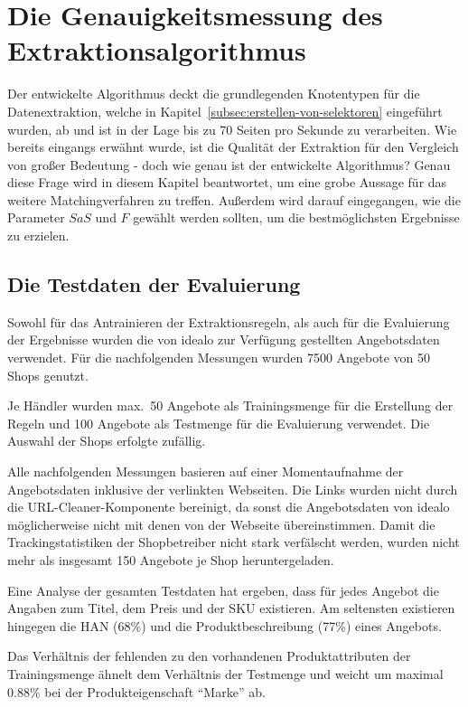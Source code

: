 \section{Die Genauigkeitsmessung des Extraktionsalgorithmus}
\label{sec:evaluierung}

Der entwickelte Algorithmus deckt die grundlegenden Knotentypen für die Datenextraktion, welche in
Kapitel~\ref{subsec:erstellen-von-selektoren} eingeführt wurden, ab und ist in der Lage bis zu 70 Seiten pro Sekunde
zu verarbeiten.
Wie bereits eingangs erwähnt wurde, ist die Qualität der Extraktion für den Vergleich von großer Bedeutung - doch wie
genau ist der entwickelte Algorithmus?
Genau diese Frage wird in diesem Kapitel beantwortet, um eine grobe Aussage für das weitere Matchingverfahren zu
treffen.
Außerdem wird darauf eingegangen, wie die Parameter $SaS$ und $F$ gewählt werden sollten, um die bestmöglichsten
Ergebnisse zu erzielen.

\subsection{Die Testdaten der Evaluierung}
\label{subsec:testdaten}
Sowohl für das Antrainieren der Extraktionsregeln, als auch für die Evaluierung der Ergebnisse wurden die von idealo
zur Verfügung gestellten Angebotsdaten verwendet.
Für die nachfolgenden Messungen wurden 7500 Angebote von 50 Shops genutzt.

Je Händler wurden max.\ 50 Angebote als Trainingsmenge für die Erstellung der Regeln und 100 Angebote als Testmenge für
die Evaluierung verwendet.
Die Auswahl der Shops erfolgte zufällig.

Alle nachfolgenden Messungen basieren auf einer Momentaufnahme der Angebotsdaten inklusive der verlinkten Webseiten.
Die Links wurden nicht durch die URL-Cleaner-Komponente bereinigt, da sonst die Angebotsdaten von idealo
möglicherweise nicht mit denen von der Webseite übereinstimmen.
Damit die Trackingstatistiken der Shopbetreiber nicht stark verfälscht werden, wurden nicht mehr als insgesamt 150
Angebote je Shop heruntergeladen.

Eine Analyse der gesamten Testdaten hat ergeben, dass für jedes Angebot die Angaben zum Titel, dem Preis und der SKU
existieren.
Am seltensten existieren hingegen die HAN (68\%) und die Produktbeschreibung (77\%) eines Angebots.

Das Verhältnis der fehlenden zu den vorhandenen Produktattributen der Trainingsmenge ähnelt dem Verhältnis der
Testmenge und weicht um maximal 0.88\% bei der Produkteigenschaft ``Marke'' ab.

